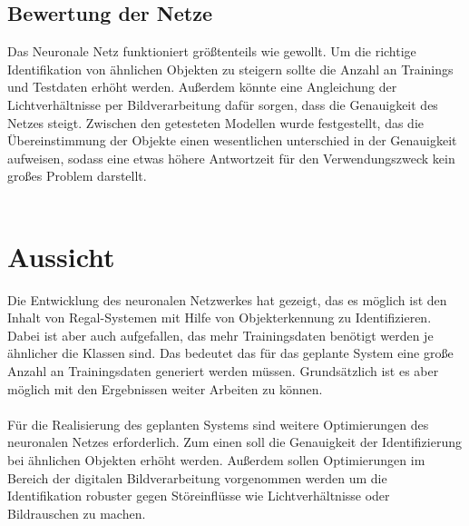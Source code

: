 \documentclass[a4paper,12pt,oneside]{article}
\begin{document}
\subsection{Bewertung der Netze}
Das Neuronale Netz funktioniert größtenteils wie gewollt. Um die richtige Identifikation von ähnlichen Objekten zu steigern sollte die Anzahl an Trainings und Testdaten erhöht werden. Außerdem könnte eine Angleichung der Lichtverhältnisse per Bildverarbeitung dafür sorgen, dass die Genauigkeit des Netzes steigt. Zwischen den getesteten Modellen wurde festgestellt, das die Übereinstimmung der Objekte einen wesentlichen unterschied in der Genauigkeit aufweisen, sodass eine etwas höhere Antwortzeit für den Verwendungszweck kein großes Problem darstellt.\\
\\

\newpage

\section{Aussicht}
Die Entwicklung des neuronalen Netzwerkes hat gezeigt, das es möglich ist den Inhalt von Regal-Systemen mit Hilfe von Objekterkennung zu Identifizieren. Dabei ist aber auch aufgefallen, das mehr Trainingsdaten benötigt werden je ähnlicher die Klassen sind. Das bedeutet das für das geplante System eine große Anzahl an Trainingsdaten generiert werden müssen. Grundsätzlich ist es aber möglich mit den Ergebnissen weiter Arbeiten zu können.\\
\\
Für die Realisierung des geplanten Systems sind weitere Optimierungen des neuronalen Netzes erforderlich. Zum einen soll die Genauigkeit der Identifizierung bei ähnlichen Objekten erhöht werden. Außerdem sollen Optimierungen im Bereich der digitalen Bildverarbeitung vorgenommen werden um die Identifikation robuster gegen Störeinflüsse wie Lichtverhältnisse oder Bildrauschen zu machen. 
\\

\newpage

\printbibliography
  
\end{document}
